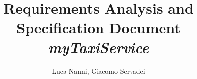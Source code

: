 \documentclass[a4paper]{report}
\begin{document}
\title{Requirements Analysis and Specification Document\linebreak
		\linebreak
		{\Huge\textit{\textbf{myTaxiService}}}
		}
\author{Luca Nanni, Giacomo Servadei}
\maketitle

\tableofcontents
\listoffigures
\listoftables





\end{document}
